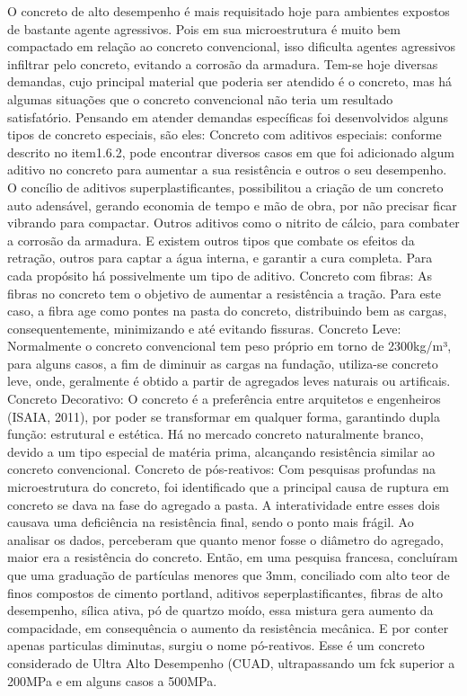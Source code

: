 O concreto de alto desempenho é mais requisitado hoje para ambientes expostos de bastante agente agressivos. Pois em sua microestrutura é muito bem compactado em relação ao concreto convencional, isso dificulta agentes agressivos infiltrar pelo concreto, evitando a corrosão da armadura.
Tem-se hoje diversas demandas, cujo principal material que poderia ser atendido é o concreto, mas há algumas situações que o concreto convencional não teria um resultado satisfatório. Pensando em atender demandas específicas foi desenvolvidos alguns tipos de concreto especiais, são eles:
	Concreto com aditivos especiais: conforme descrito no item1.6.2, pode encontrar diversos casos em que foi adicionado algum aditivo no concreto para aumentar a sua resistência e outros o seu desempenho. O concílio de aditivos superplastificantes, possibilitou a criação de um concreto auto adensável, gerando economia de tempo e mão de obra, por não precisar ficar vibrando para compactar. Outros aditivos como o nitrito de cálcio, para combater a corrosão da armadura. E existem outros tipos que combate os efeitos da retração, outros para captar a água interna, e garantir a cura completa. Para cada propósito há possivelmente um tipo de aditivo.
	Concreto com fibras: As fibras no concreto tem o objetivo de aumentar a resistência a tração. Para este caso, a fibra age como pontes na pasta do concreto, distribuindo bem as cargas, consequentemente, minimizando e até evitando fissuras.
	Concreto Leve: Normalmente o concreto convencional tem peso próprio em torno de 2300kg/m³, para alguns casos, a fim de diminuir as cargas na fundação, utiliza-se concreto leve, onde, geralmente é obtido a partir de agregados leves naturais ou artificais.
	Concreto Decorativo: O concreto é a preferência entre arquitetos e engenheiros (ISAIA, 2011), por poder se transformar em qualquer forma, garantindo dupla função: estrutural e estética. Há no mercado concreto naturalmente branco, devido a um tipo especial de matéria prima, alcançando resistência similar ao concreto convencional.
	Concreto de pós-reativos: Com pesquisas profundas na microestrutura do concreto, foi identificado que a principal causa de ruptura em concreto se dava na fase do agregado a pasta. A interatividade entre esses dois causava uma deficiência na resistência final, sendo o ponto mais frágil. Ao analisar os dados, perceberam que quanto menor fosse o diâmetro do agregado, maior era a resistência do concreto. Então, em uma pesquisa francesa, concluíram que uma graduação de partículas menores que 3mm, conciliado com alto teor de finos compostos de cimento portland, aditivos seperplastificantes, fibras de alto desempenho, sílica ativa, pó de quartzo moído, essa mistura gera aumento da compacidade, em consequência o aumento da resistência mecânica. E por conter apenas particulas diminutas, surgiu o nome pó-reativos. Esse é um concreto considerado de Ultra Alto Desempenho (CUAD, ultrapassando um fck superior a 200MPa e em alguns casos a 500MPa.